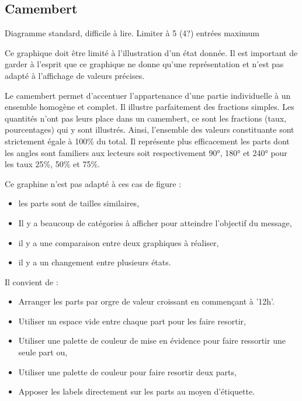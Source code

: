 \documentclass[a4paper,12pt]{article}
\begin{document}
\begin{multicols}{2}
\subsection*{Camembert}
\label{sec:orga10f57e}
Diagramme standard, difficile à lire. \autocite{alansmithLexiqueVisuel}
Limiter à 5 (4?) entrées maximum \autocite{mikeyiHowChooseRight2020}

Ce graphique doit être limité à l'illustration d'un état donnée. Il est important de garder à l'esprit que ce graphique ne donne qu'une représentation et n'est pas adapté à l'affichage de valeurs précises. \autocite{jonathanschwabishParttowhole2021}

Le camembert permet d'accentuer l'appartenance d'une partie individuelle à un ensemble homogène et complet. Il illustre parfaitement des fractions simples.\autocite{wilkeDirectoryVisualizations2019} Les quantités n'ont pas leurs place dans un camembert, ce sont les fractions (taux, pourcentages) qui y sont illustrés. Ainsi, l'ensemble des valeurs constituante sont strictement égale à 100\% du total.\autocite{wilkeVisualizingAmounts2019} Il représente plus efficacement les parts dont les angles sont familiers aux lecteurs soit respectivement 90°, 180° et 240° pour les taux 25\%, 50\% et 75\%.

Ce graphine n'est pas adapté à ces cas de figure :
\begin{itemize}
\item les parts sont de tailles similaires,\autocite{sosulskiGraphics2019}
\item Il y a beaucoup de catégories à afficher pour atteindre l'objectif du message,
\item il y a une comparaison entre deux graphiques à réaliser,\autocite{jonathanschwabishParttowhole2021}
\item il y a un changement entre plusieurs états.\autocite{wilkeDirectoryVisualizations2019}
\end{itemize}

Il convient de :
\begin{itemize}
\item Arranger les parts par orgre de valeur croissant en commençant à '12h'. \autocite{jonathanschwabishParttowhole2021}
\item Utiliser un espace vide entre chaque part pour les faire resortir, \autocite{sosulskiGraphics2019}
\item Utiliser une palette de couleur de mise en évidence pour faire ressortir une seule part ou,
\item Utiliser une palette de couleur pour faire resortir deux parts,
\item Apposer les labels directement sur les parts au moyen d'étiquette. \autocite{sosulskiGraphics2019}
\end{itemize}


\end{multicols}
\end{document}
